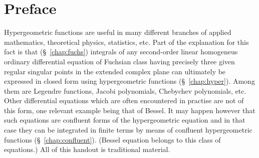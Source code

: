 
\chapter*{Preface}

Hypergeometric functions  are useful in many different branches of applied
mathematics, theoretical physics, statistics, etc.  Part of the  explanation for
this fact is that (\S~\ref{chap:fuchs}) integrals of any
second-order linear homogeneus ordinary differential equation of Fuchsian class
having precisely three given regular singular points in the extended complex
plane can ultimately be expressed in closed form using hypergeometric
functions (\S~\ref{chap:hyper}). Among them are Legendre
functions, Jacobi polynomials, Chebychev polynomials, etc.  Other differential
equations which are often encountered in practise are not of this form, one
relevant example being that of Bessel.  It may happen  however  that such
equations are confluent forms of the hypergeometric equation and in that case
they can be integrated in finite terms by means of confluent hypergeometric
functions (\S~\ref{chap:confluent}). (Bessel equation belongs to this class of
equations.) All of this handout is traditional material.

\smallskip

\noindent\textsw{\myLocation, \myTime}


\begin{flushright}
        \myName
\end{flushright}


